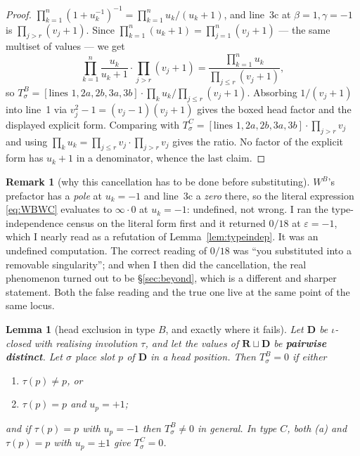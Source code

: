 \documentclass[11pt]{article}
\newtheorem{lem}[thm]{Lemma}
\theoremstyle{definition}
\newtheorem{rem}[thm]{Remark}
\newcommand{\bD}{\mathbf{D}}
\newcommand{\bR}{\mathbf{R}}
\begin{document}
\begin{proof}
$\prod_{k=1}^n(1+u_k^{-1})^{-1}=\prod_{k=1}^n u_k/(u_k+1)$, and line~3c at
$\beta=1,\gamma=-1$ is $\prod_{j>r}(v_j+1)$.  Since
$\prod_{k=1}^{n}(u_k+1)=\prod_{j=1}^{n}(v_j+1)$ --- the same multiset of values
--- we get
\[
  \prod_{k=1}^{n}\frac{u_k}{u_k+1}\cdot\prod_{j>r}(v_j+1)
  =\frac{\prod_{k=1}^{n}u_k}{\prod_{j\le r}(v_j+1)} ,
\]
so $T^{B}_\sigma=[\text{lines }1,2a,2b,3a,3b]\cdot\prod_k u_k\big/
\prod_{j\le r}(v_j+1)$.  Absorbing $1/(v_j+1)$ into line~1 via
$v_j^{2}-1=(v_j-1)(v_j+1)$ gives the boxed head factor and the displayed
explicit form.  Comparing with
$T^{C}_\sigma=[\text{lines }1,2a,2b,3a,3b]\cdot\prod_{j>r}v_j$ and using
$\prod_k u_k=\prod_{j\le r}v_j\cdot\prod_{j>r}v_j$ gives the ratio.  No factor of
the explicit form has $u_k+1$ in a denominator, whence the last claim.
\end{proof}

\begin{rem}[why this cancellation has to be done before substituting]
\label{rem:cancelfirst}
$W^{B}$'s prefactor has a \emph{pole} at $u_k=-1$ and line~3c a \emph{zero}
there, so the literal expression \eqref{eq:WBWC} evaluates to $\infty\cdot0$ at
$u_k=-1$: undefined, not wrong.  I ran the type-independence census on the
literal form first and it returned $0/18$ at $\varepsilon=-1$, which I nearly
read as a refutation of Lemma~\ref{lem:typeindep}.  It was an undefined
computation.  The correct reading of $0/18$ was ``you substituted into a
removable singularity''; and when I then did the cancellation, the real
phenomenon turned out to be \S\ref{sec:beyond}, which is a different and
sharper statement.  Both the false reading and the true one live at the same
point of the same locus.
\end{rem}

\begin{lem}[head exclusion in type $B$, and exactly where it fails]
\label{lem:head}
Let $\bD$ be $\iota$-closed with realising involution $\tau$, and let the values
of $\bR\sqcup\bD$ be \textbf{pairwise distinct}.  Let $\sigma$ place slot $p$ of
$\bD$ in a head position.  Then $T^{B}_\sigma=0$ if either
\begin{enumerate}
\item[(a)] $\tau(p)\ne p$, or
\item[(b)] $\tau(p)=p$ and $u_p=+1$;
\end{enumerate}
and if $\tau(p)=p$ with $u_p=-1$ then $T^{B}_\sigma\ne0$ in general.  In type
$C$, both (a) and $\tau(p)=p$ with $u_p=\pm1$ give $T^{C}_\sigma=0$.
\end{lem}
\end{document}
